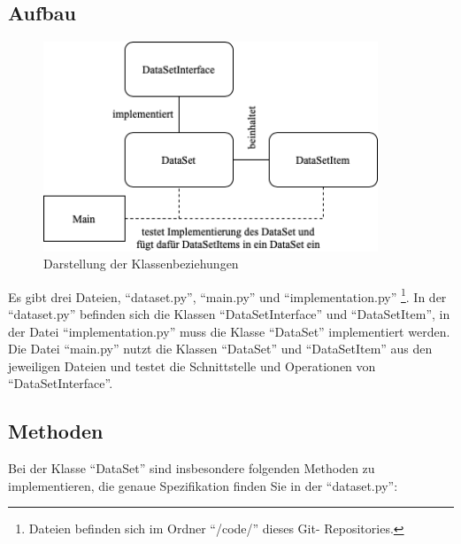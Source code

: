 \documentclass[
10pt,
a4paper
parskip=full
]{scrartcl}
\begin{document}
        \subsection{Aufbau}
        		\begin{figure}[ht]
			\centering
			\includegraphics[width=10cm]{./../diagram/classes_files.png}
			\caption{Darstellung der Klassenbeziehungen}
		\end{figure}
        Es gibt drei Dateien, "`dataset.py"', "`main.py"' und "`implementation.py"' 			\footnote{\label{foot:1}Dateien befinden sich im Ordner "`/code/"' dieses Git-		Repositories.}. In der "`dataset.py"' befinden sich die Klassen "`DataSetInterface"' 	und "`DataSetItem"', in der Datei "`implementation.py"' muss die Klasse 	"`DataSet"' implementiert werden. Die Datei "`main.py"' nutzt die Klassen 	"`DataSet"' und "`DataSetItem"' aus den jeweiligen Dateien und testet die 			Schnittstelle und Operationen von "`DataSetInterface"'.

        \subsection{Methoden}
        Bei der Klasse "`DataSet"' sind insbesondere folgenden Methoden zu 			implementieren, die genaue Spezifikation finden Sie in der "`dataset.py"':
\end{document}
